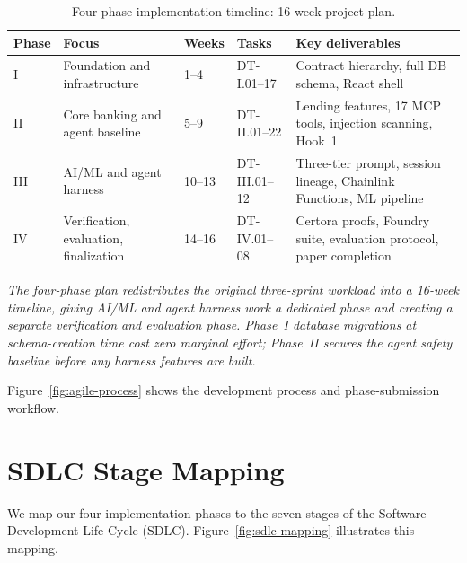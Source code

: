 \documentclass[12pt,a4paper]{report}
\begin{document}
\begin{table}[H]
\centering
\caption{Four-phase implementation timeline: 16-week project plan.}
\label{tab:timeline-summary}
\small
\begin{tabular}{p{1.5cm}p{3.5cm}p{2cm}p{2cm}p{3cm}}
\hline
\textbf{Phase} & \textbf{Focus} & \textbf{Weeks} & \textbf{Tasks} & \textbf{Key deliverables} \\
\hline
I & Foundation and infrastructure & 1--4 & DT-I.01--17 & Contract hierarchy, full DB schema, React shell \\
II & Core banking and agent baseline & 5--9 & DT-II.01--22 & Lending features, 17 MCP tools, injection scanning, Hook~1 \\
III & AI/ML and agent harness & 10--13 & DT-III.01--12 & Three-tier prompt, session lineage, Chainlink Functions, ML pipeline \\
IV & Verification, evaluation, finalization & 14--16 & DT-IV.01--08 & Certora proofs, Foundry suite, evaluation protocol, paper completion \\
\hline
\end{tabular}
\end{table}

\vspace{2pt}
\noindent\textit{\small The four-phase plan redistributes the original three-sprint workload into a 16-week timeline, giving AI/ML and agent harness work a dedicated phase and creating a separate verification and evaluation phase. Phase~I database migrations at schema-creation time cost zero marginal effort; Phase~II secures the agent safety baseline before any harness features are built.}

Figure~\ref{fig:agile-process} shows the development process and phase-submission workflow.


\section{SDLC Stage Mapping}

We map our four implementation phases to the seven stages of the Software Development Life Cycle (SDLC). Figure~\ref{fig:sdlc-mapping} illustrates this mapping.
\end{document}
